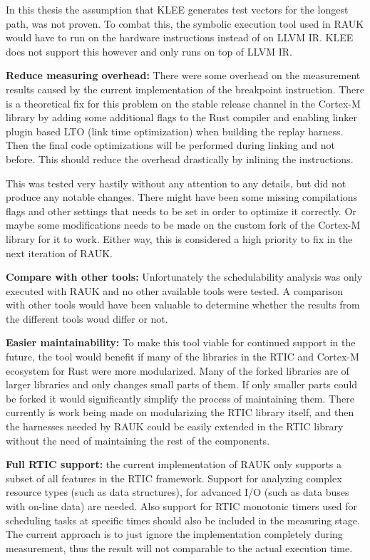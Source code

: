 In this thesis the assumption that KLEE generates test vectors for the longest
path, was not proven. To combat this, the symbolic execution tool used in RAUK
would have to run on the hardware instructions instead of on LLVM IR. KLEE does
not support this however and only runs on top of LLVM IR.

\textbf{Reduce measuring overhead:} There were some overhead on the measurement
results caused by the current implementation of the breakpoint instruction.
There is a theoretical fix for this problem on the stable release channel in
the Cortex-M library by adding some additional flags to the Rust compiler and
enabling linker plugin based LTO (link time optimization) when building the
replay harness. Then the final code optimizations will be performed during
linking and not before. This should reduce the overhead drastically by inlining
the instructions. 

This was tested very hastily without any attention to any details, but did not
produce any notable changes. There might have been some missing compilations
flags and other settings that needs to be set in order to optimize it
correctly. Or maybe some modifications needs to be made on the custom fork of
the Cortex-M library for it to work. Either way, this is considered a high
priority to fix in the next iteration of RAUK.

\textbf{Compare with other tools:} Unfortunately the schedulability analysis
was only executed with RAUK and no other available tools were tested. A
comparison with other tools would have been valuable to determine whether the
results from the different tools woud differ or not.

\textbf{Easier maintainability:} To make this tool viable for continued support
in the future, the tool would benefit if many of the libraries in the RTIC and
Cortex-M ecosystem for Rust were more modularized. Many of the forked libraries
are of larger libraries and only changes small parts of them. If only smaller
parts could be forked it would significantly simplify the process of
maintaining them. There currently is work being made on modularizing the RTIC
library itself, and then the harnesses needed by RAUK could be easily extended
in the RTIC library without the need of maintaining the rest of the components.

\textbf{Full RTIC support:} the current implementation of RAUK only supports
a subset of all features in the RTIC framework. Support for analyzing complex
resource types (such as data structures), for advanced I/O (such as data
buses with on-line data) are needed. Also support for RTIC monotonic timers used
for scheduling tasks at specific times should also be included in the measuring
stage. The current approach is to just ignore the implementation completely
during measurement, thus the result will not comparable to the actual execution
time.


